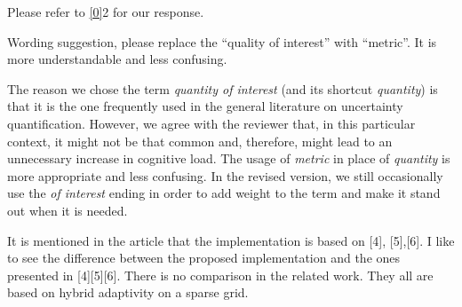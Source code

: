 \begin{authors}
Please refer to \cref{0}{2} for our response.

\begin{actions}
\end{actions}
\end{authors}

\begin{reviewer}
Wording suggestion, please replace the ``quality of interest'' with ``metric''.
It is more understandable and less confusing.
\end{reviewer}

\begin{authors}
The reason we chose the term \emph{quantity of interest} (and its shortcut
\emph{quantity}) is that it is the one frequently used in the general literature
on uncertainty quantification. However, we agree with the reviewer that, in this
particular context, it might not be that common and, therefore, might lead to an
unnecessary increase in cognitive load. The usage of \emph{metric} in place of
\emph{quantity} is more appropriate and less confusing. In the revised version,
we still occasionally use the \emph{of interest} ending in order to add weight
to the term and make it stand out when it is needed.

\begin{actions}
\end{actions}
\end{authors}

\begin{reviewer}
It is mentioned in the article that the implementation is  based on [4],
[5],[6]. I like to see the difference between the proposed implementation and
the ones presented in [4][5][6]. There is no comparison in the related work.
They all are based on hybrid adaptivity on a sparse grid.
\end{reviewer}

